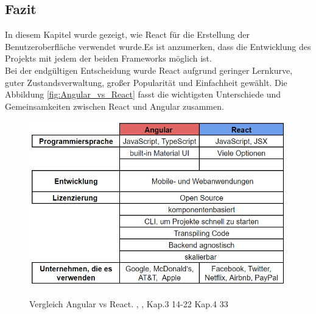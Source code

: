 \subsection*{Fazit}
In diesem Kapitel wurde gezeigt, wie React für die Erstellung der Benutzeroberfläche verwendet wurde.Es ist anzumerken, dass die Entwicklung des Projekts mit jedem der beiden Frameworks möglich ist.\\
Bei der endgültigen Entscheidung wurde React aufgrund geringer Lernkurve, guter Zustandsverwaltung, großer Popularität und Einfachheit gewählt.
Die Abbildung \autoref{fig:Angular_vs_React} fasst die wichtigsten Unterschiede und Gemeinsamkeiten zwischen React und Angular zusammen.
 
  \begin{figure}[h!]
    \centering
    \includegraphics[scale=0.7]{sources/Angular_vs_React}
    \caption[Vergleich Angular vs React]{}
    \label{fig:Angular_vs_React} 
    Vergleich Angular vs React.
    \cite{AvsR}, {\cite{E01}, Kap.3 14-22 Kap.4 33}
  \end{figure}